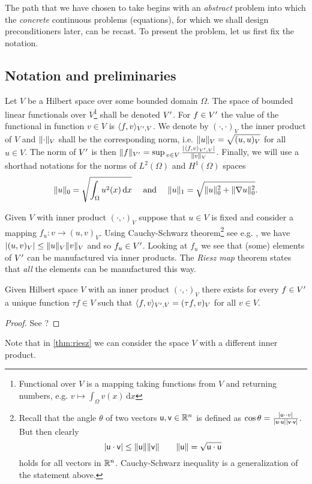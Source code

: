 The path that we have chosen to take begins with an \textit{abstract} problem into which the
\textit{concrete} continuous problems (equations), for which we shall design preconditioners later, 
can be recast. To present the problem, let us first fix the notation.

\subsection{Notation and preliminaries}
Let $V$ be a Hilbert space over some bounded domain $\Omega$. The space of bounded
linear functionals over $V$\footnote{Functional over $V$ is a mapping taking functions 
from $V$ and returning numbers, e.g. $v \mapsto \int_{\Omega} v(x)\,\mathrm{d}x$} 
shall be denoted $V^{\prime}$. For $f\in V^{\prime}$ the value of the functional in function 
$v\in V$ is $\langle f, v\rangle_{V^{\prime}, V}$. We denote by $(\cdot, \cdot)_V$
the inner product of $V$ and $\lVert\cdot\rVert_V$ shall be the corresponding norm,
i.e. $\lVert u\rVert_V=\sqrt{(u, u)_V}$ for all $u\in V$. The norm of $V^{\prime}$ is then 
$\norm{f}_{\dual{V}}=\sup_{v\in V}\tfrac{\semi{\brack{f, v}_{\dual{V},
V}}}{\norm{v}_V}$. Finally, we will use a shorthad notations for the norms of
$L^2(\Omega)$ and $H^1(\Omega)$ spaces
%
\[
  \lVert u\rVert_0 = \sqrt{\int_{\Omega} u^2(x)\,\mathrm{d}x}
  \quad
  \mbox{ and }
  \quad
  \lVert u\rVert_1 = \sqrt{\lVert u\rVert^2_0 + \lVert\nabla{u}\rVert^2_0}.
\]
%

Given $V$ with inner product $(\cdot, \cdot)_V$ suppose that $u\in V$ is fixed and
consider a mapping $f_u: v\rightarrow (u, v)_V$. Using Cauchy-Schwarz theorem\footnote{
  Recall that the angle $\theta$ of two vectors $\mathsf{u}, \mathsf{v} \in \mathbb{R}^n$ is 
  defined as $\cos{\theta}=\frac{
    \lvert\mathsf{u}\cdot\cdot{v}\rvert
  }
  {
    \lvert\mathsf{u}\cdot\mathsf{u}\rvert\lvert\mathsf{v}\cdot\mathsf{v}\rvert
  }$. But then clearly
\[
  \lvert\mathsf{u}\cdot\mathsf{v}\rvert 
  \leq \lVert\mathsf{u}\rVert\lVert\mathsf{v}\rVert
  \quad\quad
  \lVert\mathsf{u}\rVert=\sqrt{\mathsf{u}\cdot\mathsf{u}}
\]
holds for all vectors in $\mathbb{R}^n$. Cauchy-Schwarz inequality is a generalization
of the statement above.}
%
see e.g. , we have $\lvert(u, v)_V\rvert\leq\lVert u\rVert_V\lVert v\rVert_V$ and so
$f_u\in V^{\prime}$. Looking at $f_u$ we see that (some) elements of $V^{\prime}$ can 
be manufactured via inner products. The \textit{Riesz map} theorem states that
\textit{all} the elements can be manufactured this way.

\begin{theorem}\label{thm:riesz}
  Given Hilbert space $V$ with an inner product $(\cdot, \cdot)_V$ there exists
  for every $f\in V^{\prime}$ a unique function $\tau f\in V$ such that $\langle f,
  v\rangle_{V^{\prime}, V}=(\tau f, v)_V$ for all $v\in V$.
\end{theorem}
\begin{proof}
See ?
\end{proof}
Note that in \ref{thm:riesz} we can consider the space $V$ with a different inner
product. 


